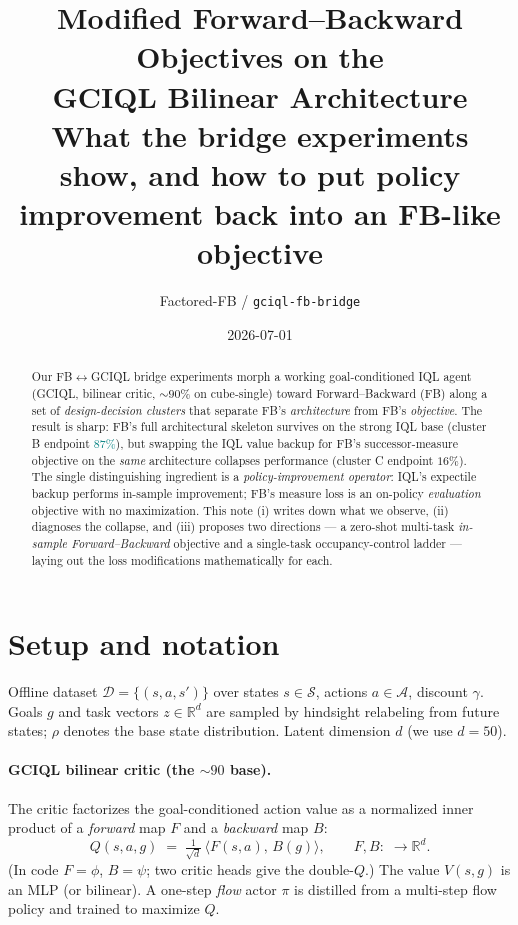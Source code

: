 \documentclass[11pt]{article}
\title{\textbf{Modified Forward--Backward Objectives on the\\
GCIQL Bilinear Architecture}\\[4pt]
\large What the bridge experiments show, and how to put policy improvement
back into an FB-like objective}
\author{Factored-FB / \texttt{gciql-fb-bridge}}
\date{2026-07-01}
\newcommand{\R}{\mathbb{R}}
\newcommand{\D}{\mathcal{D}}
\newcommand{\Sspace}{\mathcal{S}}
\newcommand{\Aspace}{\mathcal{A}}
\newcommand{\inner}[2]{\langle #1,\, #2\rangle}
\newcommand{\Fmap}{F}                                %
\newcommand{\Bmap}{B}                                %
\newcommand{\good}[1]{\textcolor{teal}{#1}}
\newcommand{\bad}[1]{\textcolor{red!70!black}{#1}}
\begin{document}
\maketitle

\begin{abstract}
Our FB${}\leftrightarrow{}$GCIQL bridge experiments morph a working
goal-conditioned IQL agent (GCIQL, bilinear critic, ${\sim}90\%$ on
cube-single) toward Forward--Backward (FB) along a set of \emph{design-decision
clusters} that separate FB's \emph{architecture} from FB's \emph{objective}.
The result is sharp: FB's full architectural skeleton survives on the strong
IQL base (cluster B endpoint \good{$87\%$}), but swapping the IQL value backup
for FB's successor-measure objective on the \emph{same} architecture collapses
performance (cluster C endpoint \bad{$16\%$}). The single distinguishing
ingredient is a \emph{policy-improvement operator}: IQL's expectile backup
performs in-sample improvement; FB's measure loss is an on-policy
\emph{evaluation} objective with no maximization. This note (i) writes down what
we observe, (ii) diagnoses the collapse, and (iii) proposes two directions --- a
zero-shot multi-task \emph{in-sample Forward--Backward} objective and a
single-task occupancy-control ladder --- laying out the loss modifications
mathematically for each.
\end{abstract}

\section{Setup and notation}

Offline dataset $\D=\{(s,a,s')\}$ over states $s\in\Sspace$, actions
$a\in\Aspace$, discount $\gamma$. Goals $g$ and task vectors $z\in\R^{d}$ are
sampled by hindsight relabeling from future states; $\rho$ denotes the base
state distribution. Latent dimension $d$ (we use $d{=}50$).

\paragraph{GCIQL bilinear critic (the ${\sim}90$ base).}
The critic factorizes the goal-conditioned action value as a normalized inner
product of a \emph{forward} map $\Fmap$ and a \emph{backward} map $\Bmap$:
\begin{equation}
  Q(s,a,g) \;=\; \tfrac{1}{\sqrt d}\,\inner{\Fmap(s,a)}{\Bmap(g)},
  \qquad \Fmap,\Bmap:\;\to\R^{d}.
  \label{eq:bilinear-q}
\end{equation}
(In code $\Fmap=\phi$, $\Bmap=\psi$; two critic heads give the double-$Q$.) The
value $V(s,g)$ is an MLP (or bilinear). A one-step \emph{flow} actor $\pi$ is
distilled from a multi-step flow policy and trained to maximize $Q$.
\end{document}
